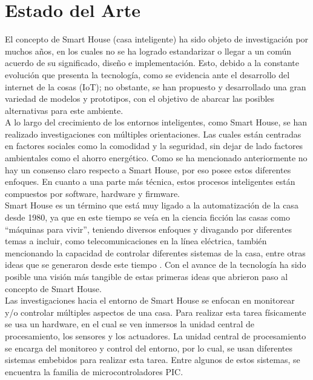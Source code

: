 \chapter{Estado del Arte}

El concepto de Smart House (casa inteligente) ha sido objeto de investigación por muchos años, en los cuales no se ha logrado estandarizar o llegar a un común acuerdo de su significado, diseño e implementación. Esto, debido a la constante evolución que presenta la tecnología, como se evidencia ante el desarrollo del internet de la cosas (IoT); no obstante, se han propuesto y desarrollado una gran variedad de modelos y prototipos, con el objetivo de abarcar las posibles alternativas para este ambiente. \\

A lo largo del crecimiento de los entornos inteligentes, como Smart House, se han realizado investigaciones con múltiples orientaciones. Las cuales están centradas en factores sociales como la comodidad y la seguridad, sin dejar de lado factores ambientales como el ahorro energético. Como se ha mencionado anteriormente no hay un consenso claro respecto a Smart House, por eso posee estos diferentes enfoques. En cuanto a una parte más técnica, estos procesos inteligentes están compuestos por software, hardware y firmware.\\

Smart House es un término que está muy ligado a la automatización de la casa desde 1980, ya que en este tiempo se veía en la ciencia ficción las casas como “máquinas para vivir”, teniendo diversos enfoques y divagando por diferentes temas a incluir, como telecomunicaciones en la línea eléctrica, también mencionando la capacidad de controlar diferentes sistemas de la casa, entre otras ideas que se generaron desde este tiempo \cite{Gross1998}. Con el avance de la tecnología ha sido posible una visión más tangible de estas primeras ideas que abrieron paso al concepto de Smart House.\\


Las investigaciones hacia el entorno de Smart House se enfocan en monitorear y/o controlar múltiples aspectos de una casa. Para realizar esta tarea físicamente se usa un hardware, en el cual se ven inmersos la unidad central de procesamiento, los sensores y los actuadores. La unidad central de procesamiento se encarga del monitoreo y control del entorno, por lo cual, se usan diferentes sistemas embebidos para realizar esta tarea. Entre algunos de estos sistemas, se encuentra la familia de microcontroladores PIC.\\

